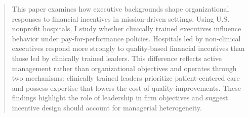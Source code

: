 \documentclass[12pt]{article}
\theoremstyle{definition}   %
\begin{document}
    \begin{abstract}
		{\small
    This paper examines how executive backgrounds shape organizational responses to financial incentives in mission-driven settings. Using U.S. nonprofit hospitals, I study whether clinically trained executives influence behavior under pay-for-performance policies. Hospitals led by non-clinical executives respond more strongly to quality-based financial incentives than those led by clinically trained leaders. This difference reflects active management rather than organizational objectives and operates through two mechanisms: clinically trained leaders prioritize patient-centered care and possess expertise that lowers the cost of quality improvements. These findings highlight the role of leadership in firm objectives and suggest incentive design should account for managerial heterogeneity.
        
        
}
\end{abstract}
\end{document}
